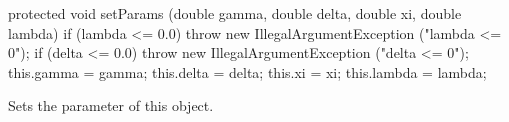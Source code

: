 \begin{hide}\begin{code}

   protected void setParams (double gamma, double delta,
                         double xi, double lambda) {
      if (lambda <= 0.0)
         throw new IllegalArgumentException ("lambda <= 0");
      if (delta <= 0.0)
         throw new IllegalArgumentException ("delta <= 0");
      this.gamma = gamma;
      this.delta = delta;
      this.xi = xi;
      this.lambda = lambda;
   }
\end{code}
\begin{tabb} Sets the parameter of this object.
\end{tabb}
\begin{code}
}\end{code}
\end{hide}
